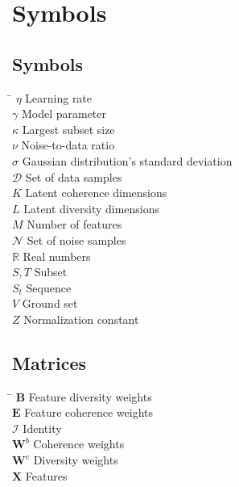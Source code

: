 \chapter*{Symbols}
\label{sec:symbols}


\section*{Symbols}

\begin{tabbing}
 \hspace*{1.6cm} \= \kill
 $\eta$ \> Learning rate \\ [0.5ex]
 $\gamma$ \> Model parameter \\ [0.5ex]
 $\kappa$ \> Largest subset size \\ [0.5ex]
 $\nu$ \> Noise-to-data ratio \\ [0.5ex]
 $\sigma$ \> Gaussian distribution's standard deviation \\ [0.5ex]
 $\mathcal{D}$ \> Set of data samples \\ [0.5ex]
 $K$ \> Latent coherence dimensions \\ [0.5ex]
 $L$ \> Latent diversity dimensions \\ [0.5ex]
 $M$ \> Number of features \\ [0.5ex]
 $\mathcal{N}$ \> Set of noise samples \\ [0.5ex]
 $\mathbb{R}$ \> Real numbers \\ [0.5ex]
 $S,T$ \> Subset \\ [0.5ex]
 $S_{t}$ \> Sequence \\ [0.5ex]
 $V$ \> Ground set \\ [0.5ex]
 $Z$ \> Normalization constant \\ [0.5ex]
\end{tabbing}

\section*{Matrices}

\begin{tabbing}
  \hspace*{1.6cm} \= \kill
  $\mathbf{B}$ \> Feature diversity weights \\ [0.5ex]
  $\mathbf{E}$ \> Feature coherence weights \\ [0.5ex]
  $\mathcal{I}$ \> Identity \\ [0.5ex]
  $\mathbf{W}^{b}$ \> Coherence weights \\ [0.5ex]
  $\mathbf{W}^{e}$ \> Diversity weights \\ [0.5ex]
  $\mathbf{X}$ \> Features \\ [0.5ex]
\end{tabbing}

